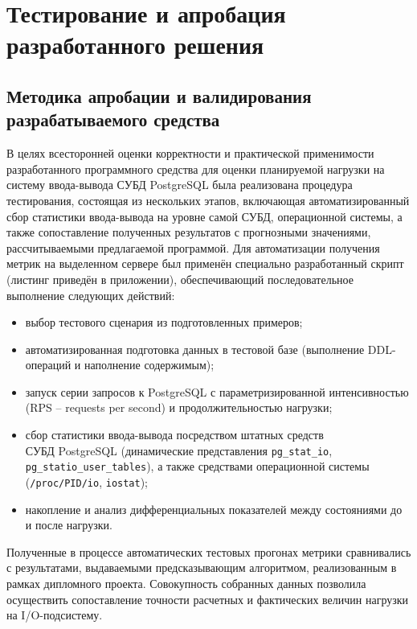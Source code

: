 \section{Тестирование и апробация разработанного решения}

\subsection{Методика апробации и валидирования разрабатываемого средства}

В целях всесторонней оценки корректности и практической применимости разработанного программного средства 
для оценки планируемой нагрузки на систему ввода-вывода СУБД PostgreSQL была реализована процедура тестирования, 
состоящая из нескольких этапов, включающая автоматизированный сбор статистики ввода-вывода на уровне самой СУБД, 
операционной системы, а также сопоставление полученных результатов с прогнозными значениями, 
рассчитываемыми предлагаемой программой. Для автоматизации получения метрик на выделенном сервере был применён 
специально разработанный скрипт (листинг приведён в приложении), обеспечивающий последовательное выполнение следующих действий:

\begin{itemize} 
    \item выбор тестового сценария из подготовленных примеров; 
    \item автоматизированная подготовка данных в тестовой базе (выполнение DDL-операций и наполнение содержимым); 
    \item запуск серии запросов к PostgreSQL с параметризированной интенсивностью (RPS -- requests per second) и продолжительностью нагрузки; 
    \item сбор статистики ввода-вывода посредством штатных средств \\
        СУБД PostgreSQL (динамические представления \texttt{pg\_stat\_io}, \\
        \texttt{pg\_statio\_user\_tables}), 
        а также средствами операционной системы (\texttt{/proc/PID/io}, \texttt{iostat}); 
    \item накопление и анализ дифференциальных показателей между состояниями до и после нагрузки. 
\end{itemize}

Полученные в процессе автоматических тестовых прогонах метрики сравнивались с результатами, 
выдаваемыми предсказывающим алгоритмом, реализованным в рамках дипломного проекта. Совокупность собранных данных 
позволила осуществить сопоставление точности расчетных и фактических величин нагрузки на I/O-подсистему.


